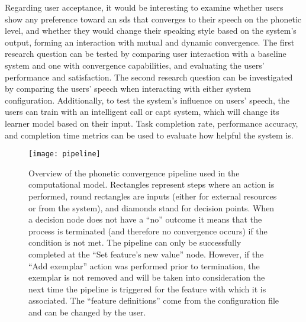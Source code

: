 Regarding user acceptance, it would be interesting to examine whether users show any preference toward an \ac{sds} that converges to their speech on the phonetic level, and whether they would change their speaking style based on the system's output, forming an interaction with mutual and dynamic convergence.
The first research question can be tested by comparing user interaction with a baseline system and one with convergence capabilities, and evaluating the users' performance and satisfaction.
The second research question can be investigated by comparing the users' speech when interacting with either system configuration.
Additionally, to test the system's influence on users' speech, the users can train with an intelligent \acf{call} or \acf{capt} system, which will change its learner model based on their input.
Task completion rate, performance accuracy, and completion time metrics can be used to evaluate how helpful the system is.

\begin{figure}[h!]
	\centering
	\texttt{[image: pipeline]}
	\caption[Phonetic convergence algorithm pipeline]{Overview of the phonetic convergence pipeline used in the computational model.
		Rectangles represent steps where an action is performed, round rectangles are inputs (either for external resources or from the system), and diamonds stand for decision points.
		When a decision node does not have a \enquote{no} outcome it means that the process is terminated (and therefore no convergence occurs) if the condition is not met.
		The pipeline can only be successfully completed at the \enquote{Set feature's new value} node.
		However, if the \enquote{Add exemplar} action was performed prior to termination, the exemplar is not removed and will be taken into consideration the next time the pipeline is triggered for the feature with which it is associated.
		The \enquote{feature definitions} come from the configuration file and can be changed by the user.}
	\label{fig:adaptation_module_pipeline}
\end{figure}



